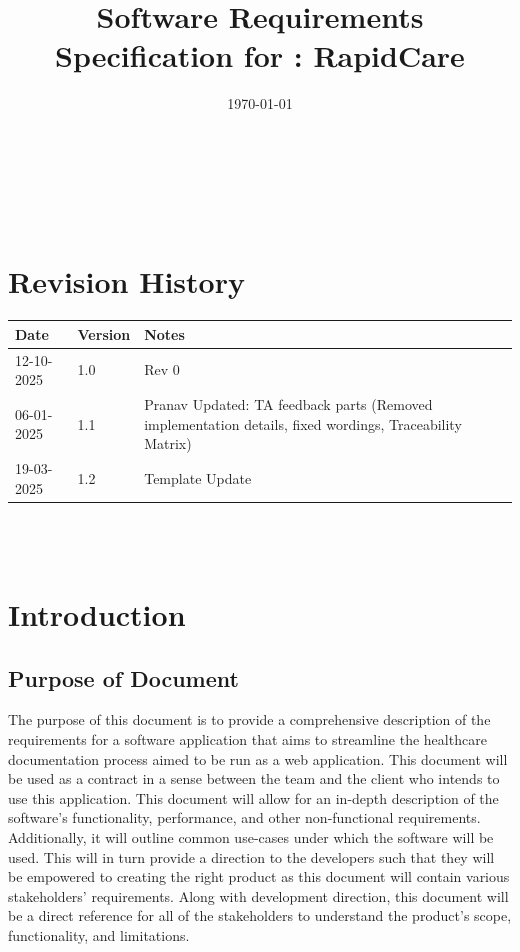 \documentclass[12pt]{article}
\begin{document}
\title{Software Requirements Specification for \progname: RapidCare} 
\author{\authname}
\date{\today}
	
\maketitle

~\newpage


\tableofcontents

~\newpage

\section*{Revision History}

\begin{tabularx}{\textwidth}{p{3cm}p{2cm}X}
\toprule {\textbf{Date}} & {\textbf{Version}} & {\textbf{Notes}}\\
\midrule
12-10-2025 & 1.0 & Rev 0\\
06-01-2025 & 1.1 & Pranav Updated: TA feedback parts (Removed implementation details, fixed wordings, Traceability Matrix)\\
19-03-2025 & 1.2 & Template Update \\
\bottomrule
\end{tabularx}

~\\

~\newpage

\section{Introduction}

\subsection{Purpose of Document} \label{sec_PurposeOfDocument}
The purpose of this document is to provide a comprehensive description of the requirements for a software application that aims to streamline the healthcare documentation process aimed to be run as a web application. This document will be used as a contract in a sense between the team and the client who intends to use this application. This document will allow for an in-depth description of the software's functionality, performance, and other non-functional requirements. Additionally, it will outline common use-cases under which the software will be used. This will in turn provide a direction to the developers such that they will be empowered to creating the right product as this document will contain various stakeholders' requirements. Along with development direction, this document will be a direct reference for all of the stakeholders to understand the product's scope, functionality, and limitations.
\end{document}
